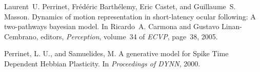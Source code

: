 \documentclass[11pt,french,a4paper,oneside]{article}%
\begin{document}
\begin{etaremune}
\item %
Laurent~U. Perrinet, Fr{\'e}d{\'e}ric Barth{\'e}lemy, Eric Castet, and
  Guillaume~S. Masson.
\newblock Dynamics of motion representation in short-latency ocular following:
  A two-pathways bayesian model.
\newblock In Ricardo~A. Carmona and Gustavo Linan-Cembrano, editors,
  \emph{Perception}, volume~34 of \emph{E{CVP}}, page~38, 2005.

\item {}
\item {}
\item {}

\item Perrinet, L. U., and Samuelides, M.
	\newblock A generative model for {S}pike {T}ime {D}ependent {H}ebbian {P}lasticity.
	\newblock In \emph{Proceedings of DYNN}, 2000.

\end{etaremune}%
\end{document}
